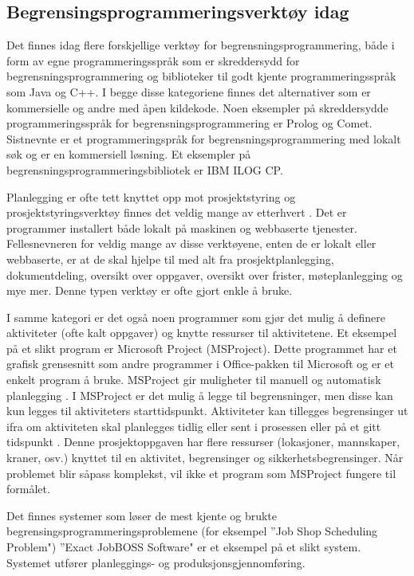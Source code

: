 \subsection{Begrensingsprogrammeringsverktøy idag}
Det finnes idag flere forskjellige verktøy for begrensningsprogrammering, både i form av egne programmeringsspråk som er skreddersydd for begrensningsprogrammering og biblioteker til godt kjente programmeringsspråk som Java og C++. I begge disse kategoriene finnes det alternativer som er kommersielle og andre med åpen kildekode. Noen eksempler på skreddersydde programmeringsspråk for begrensningsprogrammering er Prolog og Comet. Sistnevnte er et programmeringspråk for begrensningsprogrammering med lokalt søk og er en kommersiell løsning. Et eksempler på begrensningsprogrammeringsbibliotek er IBM ILOG CP.

Planlegging er ofte tett knyttet opp mot prosjektstyring og prosjektstyringsverktøy finnes det veldig mange av etterhvert \cite{projectmanagmenttoolswiki}. Det er programmer installert både lokalt på maskinen og webbaserte tjenester. Fellesnevneren for veldig mange av disse verktøyene, enten de er lokalt eller webbaserte, er at de skal hjelpe til med alt fra prosjektplanlegging, dokumentdeling, oversikt over oppgaver, oversikt over frister, møteplanlegging og mye mer. Denne typen verktøy er ofte gjort enkle å bruke.

I samme kategori er det også noen programmer som gjør det mulig å definere aktiviteter (ofte kalt oppgaver) og knytte ressurser til aktivitetene. Et eksempel på et slikt program er Microsoft Project (MSProject). Dette programmet har et grafisk grensesnitt som andre programmer i Office-pakken til Microsoft og er et enkelt program å bruke. MSProject gir muligheter til manuell og automatisk planlegging \cite{msproject2010blog}. I MSProject er det mulig å legge til begrensninger, men disse kan kun legges til aktiviteters starttidspunkt. Aktiviteter kan tillegges begrensinger ut ifra om aktiviteten skal planlegges tidlig eller sent i prosessen eller på et gitt tidspunkt \cite{begrensingermsproject}. Denne prosjektoppgaven har flere ressurser (lokasjoner, mannskaper, kraner, osv.) knyttet til en aktivitet, begrensinger og sikkerhetsbegrensinger. Når problemet blir såpass komplekst, vil ikke et program som MSProject fungere til formålet.

Det finnes systemer som løser de mest kjente og brukte begrensingsprogrammeringsproblemene (for eksempel ''Job Shop Scheduling Problem")  ''Exact JobBOSS Software" er et eksempel på et slikt system. Systemet utfører planleggings- og produksjonsgjennomføring\cite{exact}.

